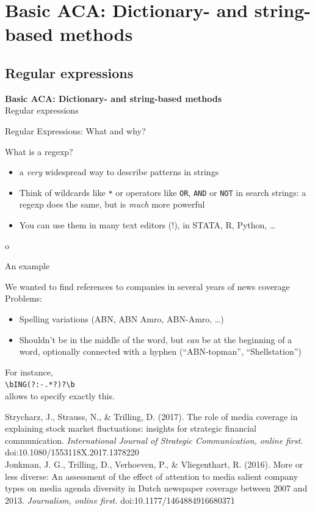 \documentclass{beamer}
\begin{document}
\section[Basic ACA]{Basic ACA: Dictionary- and string-based methods}

\subsection{Regular expressions}
\begin{frame}
	\textbf{Basic ACA: Dictionary- and string-based methods}\\
	Regular expressions
\end{frame}


\begin{frame}{Regular Expressions: What and why?}
\begin{block}{What is a regexp?}
\begin{itemize}
\item<1-> a \emph{very} widespread way to describe patterns in strings
\item<2-> Think of wildcards like {\tt{*}} or operators like {\tt{OR}}, {\tt{AND}} or {\tt{NOT}} in search strings: a regexp does the same, but is \emph{much} more powerful
\item<3-> You can use them in many text editors (!), in STATA, R, Python, \ldots 
\end{itemize}
\end{block}
\end{frame}o

\begin{frame}{An example}
\begin{block}{We wanted to find references to companies in several years of news coverage}
Problems: 
\begin{itemize}
\item Spelling variations (ABN, ABN Amro, ABN-Amro, \ldots)
\item Shouldn't be in the middle of the word, but \emph{can} be at the beginning of a word, optionally connected with a hyphen (``ABN-topman'', ``Shellstation'')
\end{itemize}
For instance, \\
{\texttt{\textbackslash bING(?:-.*?)?\textbackslash b}} \\
allows to specify exactly this.
\end{block}
{\tiny{Strycharz, J., Strauss, N., \& Trilling, D. (2017). The role of media coverage in explaining stock market fluctuations: insights for strategic financial communication. \textit{International Journal of Strategic Communication, online first}. doi:10.1080/1553118X.2017.1378220 \\
Jonkman, J. G., Trilling, D., Verhoeven, P., \& Vliegenthart, R. (2016). More or less diverse: An assessment of the effect of attention to media salient company types on media agenda diversity in Dutch newspaper coverage between 2007 and 2013.\textit{ Journalism, online first.} doi:10.1177/1464884916680371\\ } }
\end{frame}
\end{document}
